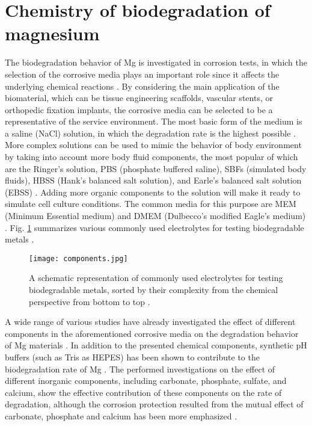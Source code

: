 \section{Chemistry of biodegradation of magnesium}


The biodegradation behavior of Mg is investigated in corrosion tests, in which the selection of the corrosive media plays an important role since it affects the underlying chemical reactions \cite{Mei2020}. By considering the main application of the biomaterial, which can be tissue engineering scaffolds, vascular stents, or orthopedic fixation implants, the corrosive media can be selected to be a representative of the service environment. The most basic form of the medium is a saline (NaCl) solution, in which the degradation rate is the highest possible \cite{Mei2020}. More complex solutions can be used to mimic the behavior of body environment by taking into account more body fluid components, the most popular of which are the Ringer's solution, PBS (phosphate buffered saline), SBFs (simulated body fluids), HBSS (Hank's balanced salt solution), and Earle's balanced salt solution (EBSS) \cite{Mei2020}. Adding more organic components to the solution will make it ready to simulate cell culture conditions. The common media for this purpose are MEM (Minimum Essential medium) and DMEM (Dulbecco's modified Eagle's medium) \cite{Mei2020}. Fig. \ref{fig:components} summarizes various commonly used electrolytes for testing biodegradable metals \cite{Mei2020}.


\begin{figure}
\centering
\medskip
\texttt{[image: components.jpg]}
\caption[Commonly used electrolytes for testing biodegradable metals]{A schematic representation of commonly used electrolytes for testing biodegradable metals, sorted by their complexity from the chemical perspective from bottom to top \cite{Mei2020}.} 
\label{fig:components}
\end{figure}

A wide range of various studies have already investigated the effect of different components in the aforementioned corrosive media on the degradation behavior of Mg materials \cite{Mei2019,Zeng2014,Johnston2017, Lamaka2018,Mei2019a}. In addition to the presented chemical components, synthetic pH buffers (such as Tris as HEPES) has been shown to contribute to the biodegradation rate of Mg \cite{Mei2019}. The performed investigations on the effect of different inorganic components, including carbonate, phosphate, sulfate, and calcium, show the effective contribution of these components on the rate of degradation, although the corrosion protection resulted from the mutual effect of carbonate, phosphate and calcium has been more emphasized \cite{Mei2019,Lamaka2018}.




